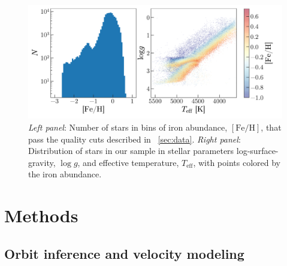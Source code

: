 \documentclass[modern, letterpaper]{aastex62}
\newcommand{\logg}{\ensuremath{\log g}}
\newcommand{\Teff}{\ensuremath{T_{\textrm{eff}}}}
\begin{document}
\begin{figure}[h]
\begin{center}
\includegraphics[width=\textwidth]{logg_teff_feh.pdf}
\end{center}
\caption{%
\textit{Left panel}: Number of stars in bins of iron abundance,
$[\textrm{Fe}/\textrm{H}]$, that pass the quality cuts described in
\sectionname~\ref{sec:data}.
\textit{Right panel}: Distribution of stars in our sample in stellar parameters
log-surface-gravity, \logg, and effective temperature, \Teff, with points
colored by the iron abundance.
\label{fig:loggteff}
}
\end{figure}


\section{Methods}

\subsection{Orbit inference and velocity modeling}
\label{sec:fitting}
\end{document}

